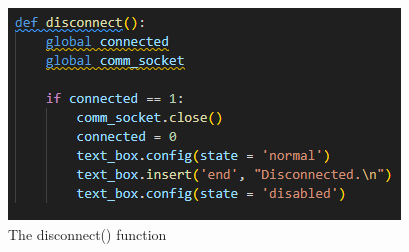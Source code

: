 \documentclass[a4paper,11pt]{report}
\theoremstyle{definition}
\theoremstyle{plain}
\begin{document}
            \begin{figure}[H]
            \includegraphics[scale=0.7]{images/disconnect func.png}
            \centering
            \caption{The disconnect() function}
            \end{figure}
            
\end{document}
